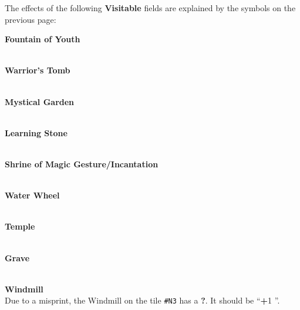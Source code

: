 \pagebreak

The effects of the following \textbf{Visitable} fields are explained by the symbols on the previous page:

\begin{multicols*}{2}
{\centering

  \phantom{j}\textbf{Fountain of Youth}\\
  \\

  \bigskip

  \phantom{j}\textbf{Warrior's Tomb}\\
  \\

  \bigskip

  \textbf{Mystical Garden}\\
  \\

  \bigskip

  \textbf{Learning Stone}\\
  \\

  \bigskip

  \phantom{j}\textbf{Shrine of Magic Gesture/Incantation}\\
  \\
  \filbreak

  \phantom{j}\textbf{Water Wheel}\phantom{j}\\
  \\

  \bigskip

  \phantom{j}\textbf{Temple}\phantom{j}\\
  \\

  \bigskip

  \phantom{j}\textbf{Grave}\phantom{j}\\
  \\

  \bigskip

  \vspace*{-2pt}
  \phantom{j}\textbf{Windmill}\phantom{j}\\
  {\small Due to a misprint, the Windmill on the tile \texttt{\#N3} has a \textbf{?}. It should be ``\textbf{+}1 ''.}


}
\end{multicols*}
